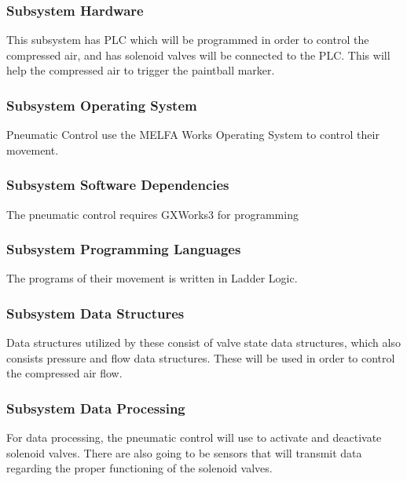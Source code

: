 \subsubsection{Subsystem Hardware}
This subsystem has PLC which will be programmed in order to control the compressed air, and has solenoid valves will be connected to the PLC. This will help the compressed air to trigger the paintball marker.

\subsubsection{Subsystem Operating System}
Pneumatic Control use the MELFA Works Operating System to control their movement.

\subsubsection{Subsystem Software Dependencies}
The pneumatic control requires GXWorks3 for programming

\subsubsection{Subsystem Programming Languages}
The programs of their movement is written in Ladder Logic.

\subsubsection{Subsystem Data Structures}
Data structures utilized by these consist of valve state data structures, which also consists pressure and flow data structures. These will be used in order to control the compressed air flow.

\subsubsection{Subsystem Data Processing}
For data processing, the pneumatic control will use to activate and deactivate solenoid valves. There are also going to be sensors that will transmit data regarding the proper functioning of the solenoid valves.